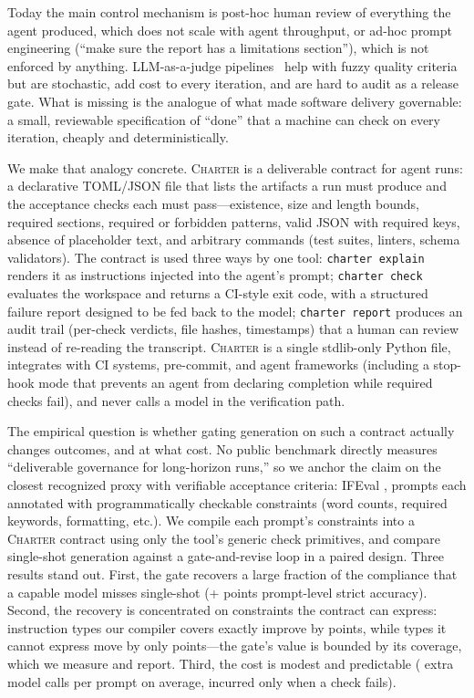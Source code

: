 \documentclass{article}
\begin{document}
Today the main control mechanism is post-hoc human review of everything the agent
produced, which does not scale with agent throughput, or ad-hoc prompt
engineering (``make sure the report has a limitations section''), which is not
enforced by anything. LLM-as-a-judge pipelines~\citep{zheng2023judging} help with
fuzzy quality criteria but are stochastic, add cost to every iteration, and are
hard to audit as a release gate. What is missing is the analogue of what made
software delivery governable: a small, reviewable specification of ``done'' that
a machine can check on every iteration, cheaply and deterministically.

We make that analogy concrete. \textsc{Charter} is a deliverable contract for
agent runs: a declarative TOML/JSON file that lists the artifacts a run must
produce and the acceptance checks each must pass---existence, size and length
bounds, required sections, required or forbidden patterns, valid JSON with
required keys, absence of placeholder text, and arbitrary commands (test suites,
linters, schema validators). The contract is used three ways by one tool:
\texttt{charter explain} renders it as instructions injected into the agent's
prompt; \texttt{charter check} evaluates the workspace and returns a CI-style
exit code, with a structured failure report designed to be fed back to the model;
\texttt{charter report} produces an audit trail (per-check verdicts, file hashes,
timestamps) that a human can review instead of re-reading the transcript.
\textsc{Charter} is a single stdlib-only Python file, integrates with CI systems,
pre-commit, and agent frameworks (including a stop-hook mode that prevents an
agent from declaring completion while required checks fail), and never calls a
model in the verification path.

The empirical question is whether gating generation on such a contract actually
changes outcomes, and at what cost. No public benchmark directly measures
``deliverable governance for long-horizon runs,'' so we anchor the claim on the
closest recognized proxy with verifiable acceptance criteria: IFEval
\citep{zhou2023ifeval}, \NPrompts{} prompts each annotated with programmatically
checkable constraints (word counts, required keywords, formatting, etc.). We
compile each prompt's constraints into a \textsc{Charter} contract using only the
tool's generic check primitives, and compare single-shot generation against a
gate-and-revise loop in a paired design. Three results stand out. First, the gate
recovers a large fraction of the compliance that a capable model misses
single-shot (+\DeltaPromptStrict{} points prompt-level strict accuracy). Second,
the recovery is concentrated on constraints the contract can express: instruction
types our compiler covers exactly improve by \ExactDelta{} points, while types it
cannot express move by only \UncoveredDelta{} points---the gate's value is bounded
by its coverage, which we measure and report. Third, the cost is modest and
predictable (\MeanRevisions{} extra model calls per prompt on average, incurred
only when a check fails).
\end{document}
